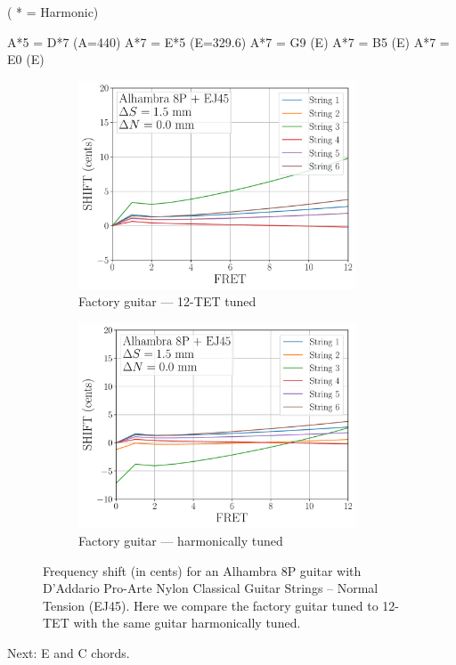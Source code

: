  ( * = Harmonic)

A*5  = D*7 (A=440)
A*7 = E*5 (E=329.6)
A*7 = G9 (E)
A*7 = B5 (E)
A*7 = E0 (E)


 \begin{figure}
  \centering
  \begin{subfigure}[b]{0.45\textwidth}
   \centering
   \includegraphics[width=3.25in]{figures/shift_alhambra8p_ej45_factory}
   \caption{Factory guitar --- 12-TET tuned}
   \label{fig:shift_alhambra8p_ej45_fact_temp}
  \end{subfigure}
  \hspace{0.25in}
  \begin{subfigure}[b]{0.45\textwidth}
   \centering
   \includegraphics[width=3.25in]{figures/shift_alhambra8p_ej45_harmonic}
   \caption{Factory guitar --- harmonically tuned}
   \label{fig:shift_alhambra8p_ej45_harmonic}
  \end{subfigure}
  \caption{\label{fig:compensation_alhambra8p_ej45_temp} Frequency shift (in cents) for an Alhambra 8P guitar with D'Addario Pro-Arte Nylon Classical Guitar Strings -- Normal Tension (EJ45). Here we compare the factory guitar tuned to 12-TET with the same guitar harmonically tuned.}
 \end{figure}

Next: E and C chords.